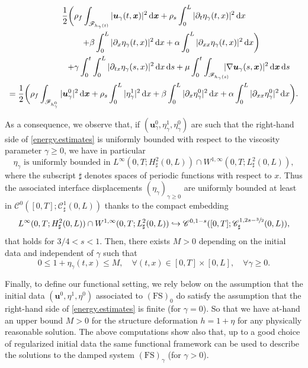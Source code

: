 \documentclass[10pt]{amsart}
\let\mathcal\mathscr
\newcommand\hto{\mathrel{\lhook\joinrel\to}}
\newcommand{\FS}{\mathrm{FS}}
\theoremstyle{remark}
\theoremstyle{definition}
\newcommand{\ug}{\boldsymbol{u}}
\newcommand{\xg}{\boldsymbol{x}}
\newcommand{\dd}{\,\mathrm{d}}
\begin{document}
\begin{multline}\label{energy.estimates}
\frac{1}{2}\biggl(\rho_{f}\int_{\mathcal{F}_{h_{\gamma}(t)}}\vert\ug_{\gamma}(t, \xg) \vert^{2} \dd\xg + \rho_{s}\int_{0}^{L}\vert\partial_{t}\eta_{\gamma}(t, x) \vert^{2} \dd x\\
\hspace*{15mm}+\beta\int_{0}^{L}\vert\partial_{x}\eta_{\gamma}(t, x) \vert^{2} \dd x+\alpha\int_{0}^{L}\vert\partial_{xx}\eta_{\gamma}(t, x) \vert^{2} \dd x \biggr)
\\
\shoveright{+\gamma\int_0^t\int_{0}^{L}\vert\partial_{tx}\eta_{\gamma}(s, x) \vert^{2} \dd x \dd s+ \mu\int_0^t\int_{\mathcal{F}_{h_{\gamma}(s)}}\hspace*{-3mm}\vert \nabla\ug_{\gamma}(s, \xg) \vert^{2} \dd\xg\dd s}\\
=\frac{1}{2}\biggl(\rho_{f}\int_{\mathcal{F}_{h^0_{\gamma}}}\vert\ug^0_{\gamma}\vert^{2} \dd \xg+ \rho_{s}\int_{0}^{L}\vert\eta^1_{\gamma}\vert^{2}\dd x+\beta\int_{0}^{L}\vert\partial_{x}\eta^0_{\gamma}\vert^{2}\dd x+\alpha\int_{0}^{L}\vert\partial_{xx}\eta^0_{\gamma}\vert^{2}\dd x\biggr).
\end{multline}

As a consequence, we observe that, if $(\ug^0_\gamma, \eta^1_\gamma, \eta^0_\gamma)$ are such that the right-hand side of \eqref{energy.estimates} is uniformly bounded with respect to the viscosity parameter $\gamma \geq 0$, we have in particular
\[
\eta_{\gamma}\text{ is uniformly bounded in }L^{\infty}(0,T;H^{2}_{\sharp}(0,L))\cap W^{1,\infty}(0,T;L_{\sharp}^{2}(0,L)),
\]
where the subscript $\sharp$ denotes spaces of periodic functions with respect to $x$.
Thus the associated interface displacements $(\eta_\gamma)_{\gamma \geq 0}$ are uniformly bounded at least in $\mathcal{C}^{0}([0,T];\mathcal{C}^{1}_{\sharp}(0,L))$ thanks to the compact embedding
\begin{equation}
L^{\infty}(0,T;H^{2}_{\sharp}(0,L))\cap W^{1,\infty}(0,T;L_{\sharp}^{2}(0,L))\hto \mathcal{C}^{0,1-s}([0,T];\mathcal{C}^{1,2s-\sfrac{3}{2}}_{\sharp}(0,L)),
\label{inclusion-eta}
\end{equation}
that holds for $3/4<s<1$.
Then, there exists $M>0$ depending on the initial data and independent of $\gamma$ such that
\begin{equation}
\label{borne.eta}
0\leq 1+\eta_\gamma (t, x) \leq M , \quad \forall (t, x) \in [0, T]\times [0, L], \quad \forall\gamma \geq 0.
\end{equation}

Finally, to define our functional setting, we rely below on the assumption that the initial data $(\ug^0, \eta^1, \eta^0)$ associated to $(\FS)_0$ do satisfy the assumption that the right-hand side of \eqref{energy.estimates} is finite (for $\gamma =0$). So that we have at-hand an upper bound $M>0$ for the structure deformation $h=1+\eta$ for any physically reasonable solution.
The above computations show also that, up to a good choice of regularized initial data the same functional framework can be used to describe the solutions to the damped system $(\FS)_{\gamma}$ (for $\gamma >0$).
\end{document}
